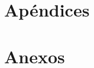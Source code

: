 \documentclass[letterpaper,11pt]{upiita}
\begin{document}
\part{Apéndices}
\appendix



\part{Anexos}
\anexo



\newpage
\IndiceAlfabetico
\end{document}
